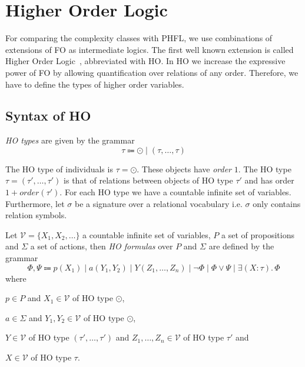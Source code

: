 

\section{Higher Order Logic}\label{sec:higherOrderLogic}

For comparing the complexity classes with PHFL, we use combinations of extensions of FO as intermediate logics. The first well
known extension is called Higher Order Logic~\cite{vanBenthem2001higher}, abbreviated with HO. In HO we
increase the expressive power of FO by allowing quantification over relations of any order. Therefore, we have to define the
types of higher order variables.

\subsection{Syntax of HO}\label{subsec:hoSyntax}

\begin{definition}
    \emph{HO types} are given by the grammar
    \[ \tau \Coloneqq \odot \mid (\tau, \dots, \tau) \]
\end{definition}

The HO type of individuals is $\tau = \odot$. These objects have \textit{order} $1$. The HO type $\tau = (\tau',
\dots, \tau')$ is that of relations between objects of HO type $\tau'$ and has order $1 + order(\tau')$. For
each HO type we have a countable infinite set of variables. Furthermore, let $\sigma$ be a signature over a
relational vocabulary i.e. $\sigma$ only contains relation symbols.

\begin{definition}
    Let $\mathcal{V} = \{X_1, X_2, \dots \}$ a countable infinite set of variables, $P$ a set of propositions and $\Sigma$ a set of actions, then \emph{HO
    formulas} over $P$ and $\Sigma$ are defined by the grammar
    \[\Phi, \Psi \Coloneqq p(X_1) \mid a(Y_1, Y_2) \mid Y(Z_1, \dots, Z_n) \mid \neg \Phi \mid \Phi \vee \Psi \mid \exists
    (X \colon \tau).\,\Phi\]
    where
    \begin{compactitem}
        \item $p \in P$ and $X_1 \in \mathcal{V}$ of HO type $\odot$,
        \item $a \in \Sigma$ and $Y_1, Y_2 \in \mathcal{V}$ of HO type $\odot$,
        \item $Y \in \mathcal{V}$ of HO type $(\tau', \dots, \tau')$ and $Z_1, \dots, Z_n \in \mathcal{V}$ of HO type $\tau'$ and
        \item $X \in \mathcal{V}$ of HO type $\tau$.
    \end{compactitem}
\end{definition}

